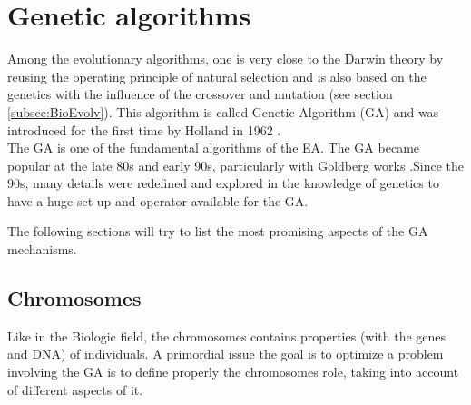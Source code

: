 \section{Genetic algorithms} \label{sec:GAdetail}
Among the evolutionary algorithms, one is very close to the Darwin theory by reusing the operating principle of natural selection and is also based on the genetics with the influence of the crossover and mutation (see section \ref{subsec:BioEvolv}). This algorithm is called Genetic Algorithm (GA) and was introduced for the first time by Holland in 1962 \cite{111*Holland1962}. \\
The GA is one of the fundamental algorithms of the EA.
The GA became popular at the late 80s and early 90s, particularly with Goldberg works \cite{112*goldberg1989}.Since the 90s, many details were redefined and explored in the knowledge of genetics to have a huge set-up and operator available for the GA.
  
The following sections will try to list the most promising aspects of the GA mechanisms. 
 
%


\subsection{Chromosomes} \label{par:Chromosomes}
Like in the Biologic field, the chromosomes contains properties (with the genes and DNA) of individuals.
A primordial issue the goal is to optimize a problem involving the GA is to define properly the chromosomes role, taking into account of different aspects of it.

